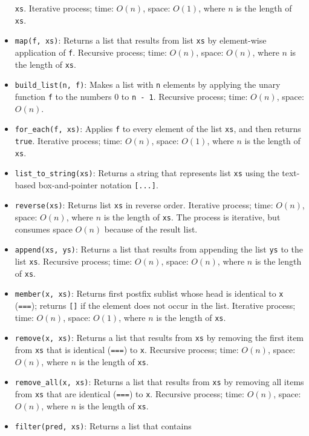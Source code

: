 \begin{itemize}
  \lstinline{xs}. 
Iterative process; time: $O(n)$, space: $O(1)$, where $n$ is the length of \lstinline{xs}.
\item \lstinline{map(f, xs)}: Returns a list that results from list
  \lstinline{xs} by element-wise application of \lstinline{f}. 
Recursive process; time: $O(n)$, space: $O(n)$, where $n$ is the length of \lstinline{xs}.
\item \lstinline{build_list(n, f)}: Makes a list with \lstinline{n}
elements by applying the unary function \lstinline{f} to the numbers 0 to \lstinline{n - 1}.
Recursive process; time: $O(n)$, space: $O(n)$.
\item \lstinline{for_each(f, xs)}: Applies \lstinline{f} to every
  element of the list \lstinline{xs}, and then returns
  \lstinline{true}. 
Iterative process; time: $O(n)$, space: $O(1)$, where $n$ is the length of \lstinline{xs}.
\item \lstinline{list_to_string(xs)}: Returns a string that represents
list \lstinline{xs} using the text-based box-and-pointer notation \lstinline{[...]}.
\item \lstinline{reverse(xs)}: Returns list \lstinline{xs} in reverse
  order. Iterative process; time: $O(n)$, space: $O(n)$, where $n$ is the length of \lstinline{xs}.
The process is iterative, but consumes space $O(n)$ because of the result list.
\item \lstinline{append(xs, ys)}: Returns a list that results from 
appending the list \lstinline{ys} to the list \lstinline{xs}.
Recursive process; time: $O(n)$, space: $O(n)$, where $n$ is the length of \lstinline{xs}.
\item \lstinline{member(x, xs)}: Returns first postfix sublist
whose head is identical to
\lstinline{x} (\lstinline{===}); returns \lstinline{[]} if the
element does not occur in the list.
Iterative process; time: $O(n)$, space: $O(1)$, where $n$ is the length of \lstinline{xs}.
\item \lstinline{remove(x, xs)}: Returns a list that results from
\lstinline{xs} by removing the first item from \lstinline{xs} that
is identical (\lstinline{===}) to \lstinline{x}. Recursive process;
time: $O(n)$, space: $O(n)$, where $n$ is the length of \lstinline{xs}.
\item \lstinline{remove_all(x, xs)}: Returns a list that results from
\lstinline{xs} by removing all items from \lstinline{xs} that
are identical (\lstinline{===}) to \lstinline{x}.
Recursive process;
time: $O(n)$, space: $O(n)$, where $n$ is the length of \lstinline{xs}.
\item \lstinline{filter(pred, xs)}: Returns a list that contains

\end{itemize}
